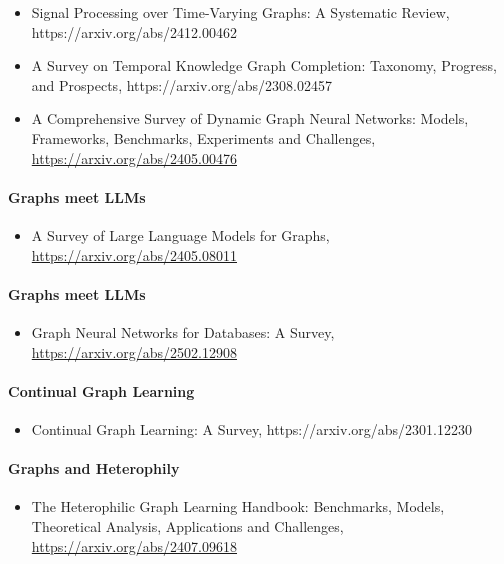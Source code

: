 \begin{itemize}
\item Signal Processing over Time-Varying Graphs: A Systematic Review, https://arxiv.org/abs/2412.00462

\item A Survey on Temporal Knowledge Graph Completion: Taxonomy, Progress, and Prospects, https://arxiv.org/abs/2308.02457

\item A Comprehensive Survey of Dynamic Graph Neural Networks: Models, Frameworks, Benchmarks, Experiments and Challenges,
\url{https://arxiv.org/abs/2405.00476}
\end{itemize}
 

\paragraph{Graphs meet LLMs}

\begin{itemize}
\item A Survey of Large Language Models for Graphs, \url{https://arxiv.org/abs/2405.08011}
\end{itemize}

\paragraph{Graphs meet LLMs}

\begin{itemize}
\item \New Graph Neural Networks for Databases: A Survey, \url{https://arxiv.org/abs/2502.12908}
\end{itemize}

\paragraph{Continual Graph Learning}

\begin{itemize}
\item Continual Graph Learning: A Survey, https://arxiv.org/abs/2301.12230
\end{itemize}
  

\paragraph{Graphs and Heterophily}

\begin{itemize}
\item The Heterophilic Graph Learning Handbook: Benchmarks, Models, Theoretical Analysis, Applications and Challenges, \url{https://arxiv.org/abs/2407.09618}
\end{itemize}


